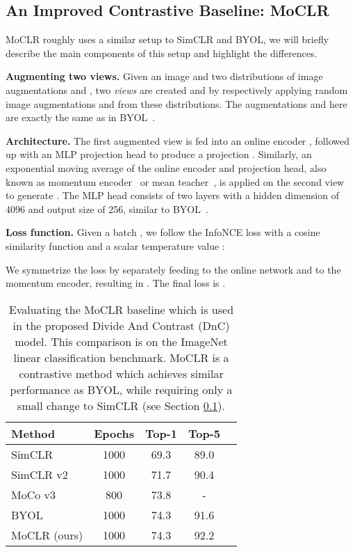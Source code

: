 \documentclass[final]{cvpr}
\newcommand\baseline{MoCLR}
\begin{document}
\subsection{An Improved Contrastive Baseline: \baseline{}}
\label{section:baseline}

\baseline{} roughly uses a similar setup to SimCLR and BYOL, we will briefly describe the main components of this setup and highlight the differences.


\noindent\textbf{Augmenting two views.} Given an image  and two distributions of image augmentations  and , two \emph{views} are created  and  by respectively applying random image augmentations  and  from these distributions. 
The augmentations  and  here are exactly the same as in BYOL~\cite{grill2020bootstrap}.


\noindent\textbf{Architecture.}
The first augmented view  is fed into an online encoder , followed up with an MLP projection head  to produce a projection . Similarly, an exponential moving average of the online encoder and projection head, also known as momentum encoder~\cite{he2020momentum} or mean teacher~\cite{tarvainen2017mean}, is applied on the second view  to generate . The MLP head consists of two layers with a hidden dimension of 4096 and output size of 256, similar to BYOL~\cite{grill2020bootstrap}. 

\noindent\textbf{Loss function.} Given a batch , we follow the InfoNCE loss \cite{oord2018representation} with a cosine similarity function  and a scalar temperature value :

We symmetrize the loss  by separately feeding  to the online network and  to the momentum encoder, resulting in . 
The final loss is . 



\begin{table}[t]
\caption{Evaluating the \baseline{} baseline which is used in the proposed Divide And Contrast (DnC) model. This comparison is on the ImageNet linear classification benchmark. \baseline{} is a contrastive method which achieves similar performance as BYOL, while requiring only a small change to SimCLR (see Section \ref{section:baseline}).}
\label{tab:linear_baseline}
\begin{center}
\begin{small}
\begin{tabular}{lcccc}
\toprule
Method & Epochs & Top-1 & Top-5 \\
\midrule 
SimCLR \cite{chen2020simple} & 1000 & 69.3 & 89.0 \\
SimCLR v2 \cite{chen2020big} & 1000 & 71.7 & 90.4 \\
MoCo v3 \cite{chen2021empirical} & 800 & 73.8 & - \\
BYOL \cite{grill2020bootstrap} & 1000 & 74.3 & 91.6 \\
\baseline{} (ours) & 1000 & 74.3 & 92.2  \\ 
\bottomrule
\end{tabular}
\end{small}
\end{center}
\end{table}
\end{document}
